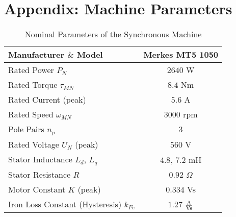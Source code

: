 \documentclass[a4paper,11pt,fleqn]{article}
\begin{document}
\clearpage


\section*{Appendix: Machine Parameters}

\begin{table}[!h]
\renewcommand{\arraystretch}{1.0}
\caption{Nominal Parameters of the Synchronous Machine\label{tbl:SMparameter}}
\centering
\begin{tabular}{|l||c|}
\hline
Manufacturer $\&$ Model  & Merkes MT5 1050   \\
\hline
Rated Power $P_N$         &  $2640$ W  \\ \hline
Rated Torque  $\tau_{MN}$ &  $8.4$ Nm  \\
\hline
Rated Current   (peak)      &  $5.6$ A \\
\hline
Rated Speed $\omega_{MN}$ &  $3000$ rpm \\
\hline
Pole Pairs  $n_p$         &  $3$ \\
\hline
Rated Voltage $U_{N}$   (peak)  &  $560$ V \\
\hline
Stator Inductance $L_d$, $L_q$     &  $4.8$, $7.2$ mH \\
\hline
Stator Resistance $R$     &  $0.92$ $\Omega$ \\
\hline
Motor Constant $K$  (peak)   &  $0.334$ Vs \\
\hline
Iron  Loss Constant (Hysteresis) $k_{Fe}$        &  $1.27$ $\frac{\textnormal{A}}{\textnormal{Vs}}$ \\
\hline
\end{tabular}
\end{table}
\end{document}
